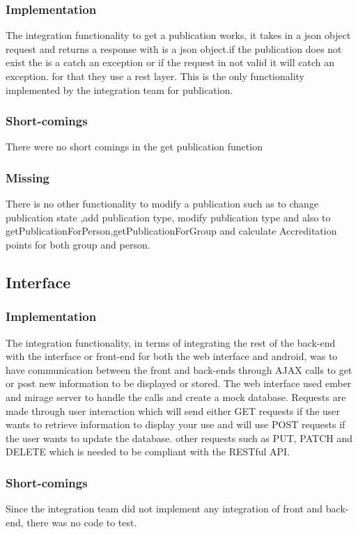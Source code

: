 \documentclass{article}
\begin{document}
		\subsubsection{Implementation}
			The integration functionality to get a publication works, it takes in a json object request and returns a response with is a json object.if the publication does not exist the is a catch an exception or if the request in not valid it will catch an exception. for that they use a rest layer. This is the only functionality implemented by the integration team for publication.
		\subsubsection{Short-comings}
		There were no short comings in the get publication function
		\subsubsection{Missing}
		There is no other functionality to modify a publication such as to change publication state ,add publication type, modify publication type and also to getPublicationForPerson,getPublicationForGroup and calculate Accreditation points for both group and person.
		
    \subsection{Interface}
        \subsubsection{Implementation}
        The integration functionality, in terms of integrating the rest of the back-end with the interface or front-end for both the web interface and android, was to have communication between the front and back-ends through AJAX calls to get or post new information to be displayed or stored. The web interface used ember and mirage server to handle the calls and create a mock database. Requests are made through user interaction which will send either GET requests if the user wants to retrieve information to display your use and will use POST requests if the user wants to update the database. other requests such as PUT, PATCH and DELETE which is needed to be compliant with the RESTful API.
        \subsubsection{Short-comings}
        Since the integration team did not implement any integration of front and back-end, there was no code to test.
\end{document}
